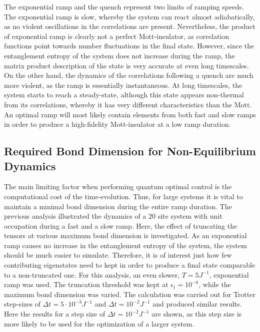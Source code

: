 The exponential ramp and the quench represent two limits of ramping speeds. The exponential ramp is slow, whereby the system can react almost adiabatically, as no violent oscillations in the correlations are present. Nevertheless, the product of exponential ramp is clearly not a perfect Mott-insulator, as correlation functions point towards number fluctuations in the final state. However, since the entanglement entropy of the system does not increase during the ramp, the matrix product description of the state is very accurate at even long timescales.
On the other hand, the dynamics of the correlations following a quench are much more violent, as the ramp is essentially instantaneous. At long timescales, the system starts to reach a steady-state, although this state appears non-thermal from its correlations, whereby it has very different characteristics than the Mott. An optimal ramp will most likely contain elements from both fast and slow ramps in order to produce a high-fidelity Mott-insulator at a low ramp duration. 



\subsection{Required Bond Dimension for Non-Equilibrium Dynamics}
The main limiting factor when performing quantum optimal control is the computational cost of the time-evolution. Thus, for large systems it is vital to maintain a minimal bond dimension during the entire ramp duration. The previous analysis illustrated the dynamics of a 20 site system with unit occupation during a fast and a slow ramp. Here, the effect of truncating the tensors at various maximum bond dimension is investigated. As an exponential ramp causes no increase in the entanglement entropy of the system, the system should be much easier to simulate. Therefore, it is of interest just how few contributing eigenstates need to kept in order to produce a final state comparable to a non-truncated one.
For this analysis, an even slower, $T = 5 J^{-1}$, exponential ramp was used. The truncation threshold was kept at $\epsilon_t = 10^{-8}$, while the maximum bond dimension was varied. The calculation was carried out for Trotter step-sizes of $\Delta t = 5 \cdot 10^{-3} J^{-1}$ and $\Delta t = 10^{-2} J^{-1}$ and produced similar results. Here the results for a step size of $\Delta t = 10^{-2} J^{-1}$ are shown, as this step size is more likely to be used for the optimization of a larger system.\\ 

